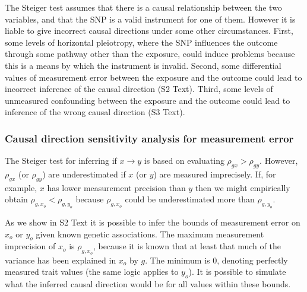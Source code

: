 \documentclass[]{article}
\begin{document}
The Steiger test assumes that there is a causal relationship between the
two variables, and that the SNP is a valid instrument for one of them.
However it is liable to give incorrect causal directions under some
other circumstances. First, some levels of horizontal pleiotropy, where
the SNP influences the outcome through some pathway other than the
exposure, could induce problems because this is a means by which the
instrument is invalid. Second, some differential values of measurement
error between the exposure and the outcome could lead to incorrect
inference of the causal direction (S2 Text). Third, some levels of
unmeasured confounding between the exposure and the outcome could lead
to inference of the wrong causal direction (S3 Text).

\hypertarget{causal-direction-sensitivity-analysis-for-measurement-error}{%
\subsubsection{Causal direction sensitivity analysis for measurement
error}\label{causal-direction-sensitivity-analysis-for-measurement-error}}

The Steiger test for inferring if \(x \rightarrow y\) is based on
evaluating \(\rho_{gx} > \rho_{gy}\). However, \(\rho_{gx}\) (or
\(\rho_{gy}\)) are underestimated if \(x\) (or \(y\)) are measured
imprecisely. If, for example, \(x\) has lower measurement precision than
\(y\) then we might empirically obtain \(\rho_{g,x_o} < \rho_{g,y_o}\)
because \(\rho_{g,x_o}\) could be underestimated more than
\(\rho_{g,y_o}\).

As we show in S2 Text it is possible to infer the bounds of measurement
error on \(x_o\) or \(y_o\) given known genetic associations. The
maximum measurement imprecision of \(x_o\) is \(\rho_{g,x_o}\), because
it is known that at least that much of the variance has been explained
in \(x_o\) by \(g\). The minimum is 0, denoting perfectly measured trait
values (the same logic applies to \(y_o\)). It is possible to simulate
what the inferred causal direction would be for all values within these
bounds.
\end{document}
